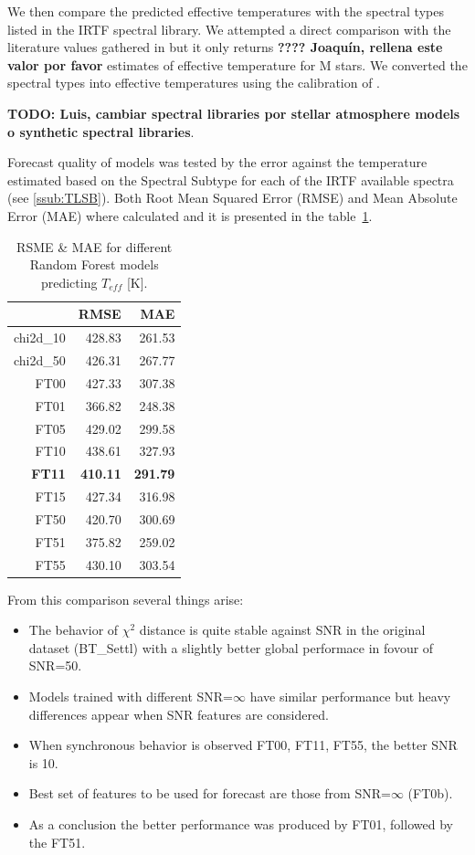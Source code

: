 We then compare the predicted effective temperatures with the spectral
types listed in the IRTF spectral library. We attempted a direct
comparison with the literature values gathered in \cite{cesetti} but
it only returns {\bf ???? Joaquín, rellena este valor por favor}
estimates of effective temperature for M stars. We converted the
spectral types into effective temperatures using the calibration
of \cite{2009ApJ...702..154S}.

{\bf TODO: Luis, cambiar spectral libraries por stellar atmosphere
models o synthetic spectral libraries}.

Forecast quality of models was tested by the error against the
temperature estimated based on the Spectral Subtype for each of the
IRTF available spectra (see \ref{ssub:TLSB}).  Both Root Mean Squared
Error (RMSE) and Mean Absolute Error (MAE) where calculated and it is
presented in the table~\ref{tab:model_Tvar}.

\begin{table}[ht]
\centering
\begin{tabular}{rrr}
  \hline
 & RMSE & MAE \\ 
  \hline
chi2d\_10 & 428.83 & 261.53 \\ 
  chi2d\_50 & 426.31 & 267.77 \\ 
  FT00 & 427.33 & 307.38 \\ 
  FT01 & 366.82 & 248.38 \\ 
  FT05 & 429.02 & 299.58 \\ 
  FT10 & 438.61 & 327.93 \\ 
  \textbf{FT11} & \textbf{410.11} & \textbf{291.79} \\ 
  FT15 & 427.34 & 316.98 \\ 
  FT50 & 420.70 & 300.69 \\ 
  FT51 & 375.82 & 259.02 \\ 
  FT55 & 430.10 & 303.54 \\ 
   \hline
\end{tabular}
\caption { RSME \& MAE for different Random Forest models predicting $T_{eff}$ [K].} 
\label{tab:model_Tvar} 
\end{table}

From this comparison several things arise:
\begin{itemize}
 \item {The behavior of $\chi^2$ distance is quite stable against SNR 
	in the original dataset (BT\_Settl) with a slightly better global 
	performace in fovour of SNR=50.}
 \item {Models trained with different SNR=$\infty$ have similar performance but heavy 
	differences appear when SNR features are considered.}
 \item {When synchronous behavior is observed FT00, FT11, FT55, the better SNR is 10.}
 \item {Best set of features to be used for forecast are those from SNR=$\infty$ (FT0b).}
 \item {As a conclusion the better performance was produced by FT01, followed by the FT51.}
\end{itemize}


